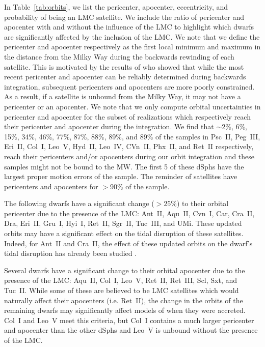 \documentclass[twocolumn]{aastex63}
\begin{document}
In Table~\ref{tab:orbits},  we list the pericenter, apocenter, eccentricity, and probability of being an LMC satellite. We include  the ratio of pericenter and apocenter  with and without the influence of the LMC  to highlight which dwarfs are significantly affected by the inclusion of the LMC. We note that we define the pericenter and apocenter respectively as the first local minimum and maximum in the distance from the Milky Way during the backwards rewinding of each satellite. This is motivated by the results of \cite{DSouza2022MNRAS.512..739D} who showed that while the most recent pericenter and apocenter can be reliably determined during backwards integration, subsequent pericenters and apocenters are more poorly constrained. As a result, if a satellite is unbound from the Milky Way, it may not have a pericenter or an apocenter. We note that we only compute orbital uncertainties in pericenter and apocenter for the subset of realizations which respectively reach their pericenter and apocenter during the integration. We find that  $\sim$2\%, 6\%, 15\%,  34\%, 46\%, 77\%,  87\%, 88\%, 89\%, and 89\%  of the samples in Psc~II, Peg~III, Eri~II,  Col~I, Leo~V, Hyd~II,  Leo~IV, CVn~II, Phx~II, and Ret~II respectively, reach their pericenters and/or apocenters during our orbit integration and these samples might not be bound to the MW. 
The first 5 of these dSphs have the largest proper motion errors of the sample. 
The reminder of satellites have pericenters and apocenters for $>90\%$ of the sample. 



The following dwarfs have a significant change ($>25\%$) to their orbital pericenter due to the presence of the  LMC: Ant~II, Aqu~II, Cvn~I, Car, Cra~II, Dra, Eri~II, Gru~I, Hyi~I, Ret~II, Sgr~II, Tuc~III, and UMi. These updated orbits may have a significant effect on the tidal disruption of these satellites. Indeed, for Ant~II and Cra~II, the effect of these updated orbits on the dwarf's tidal disruption has already been studied \citep[i.e.][]{Ji2021ApJ...921...32J}.

Several dwarfs  have a significant change to their orbital apocenter due to the presence of the LMC: Aqu~II, Col~I, Leo~V, Ret~II, Ret~III, Scl, Sxt, and Tuc~II. While some of these are believed to be LMC satellites which would naturally affect their apocenters (i.e. Ret~II), the change in the orbits of the remaining dwarfs may significantly affect models of when they were accreted.
Col~I and Leo~V meet this criteria, but Col~I contains a much larger pericenter and apocenter than the other dSphs and Leo~V is unbound without the presence of the LMC. 
\end{document}

